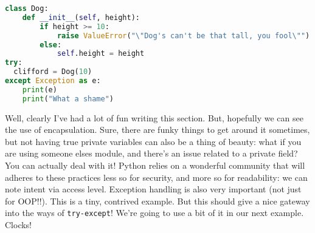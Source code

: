 \documentclass[12pt]{article}
\begin{document}
\begin{lstlisting}[language=Python]
class Dog:
    def __init__(self, height):
        if height >= 10:
            raise ValueError("\"Dog's can't be that tall, you fool\"")
        else:
            self.height = height
try:
  clifford = Dog(10)
except Exception as e:
    print(e)
    print("What a shame")
\end{lstlisting}
Well, clearly I've had a lot of fun writing this section. But, hopefully we can see the use of encapsulation. Sure, there are funky things to get around it sometimes, but not having true private variables can also be a thing of beauty: what if you are using someone elses module, and there's an issue related to a private field? You can actually deal with it! Python relies on a wonderful community that will adheres to these practices less so for security, and more so for readability: we can note intent via access level. Exception handling is also very important (not just for OOP!!). This is a tiny, contrived example. But this should give a nice gateway into the ways of \texttt{try-except}! We're going to use a bit of it in our next example. Clocks!\\

\\
\end{document}
